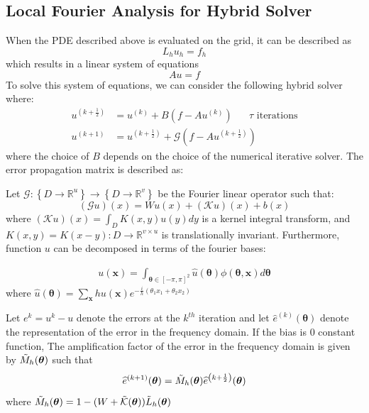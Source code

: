 \documentclass[12pt]{article}
\begin{document}
\subsection{Local Fourier Analysis for Hybrid Solver}

When the PDE described above is evaluated on the grid, it can be described as
$$L_hu_h = f_h$$
which results in a linear system of equations
$$Au = f$$
To solve this system of equations, we can consider the following hybrid solver where:
\begin{align*}
    u^{\left(k + \frac{1}{2}\right)} &= u^{\left(k \right)} + B(f - Au^{\left(k \right)}) \quad \text{ $\tau$ iterations}\\
    u^{\left(k + 1\right)} &= u^{\left(k + \frac{1}{2}\right)} + \mathcal{G}\left(f - Au^{\left(k + \frac{1}{2}\right)}\right)
\end{align*}
where the choice of $B$ depends on the choice of the numerical iterative solver. The error propagation matrix is described as:

Let $\mathcal{G}: \left\{D \to \mathbb{R}^u\right\} \to \left\{D \to \mathbb{R}^v\right\}$ be the Fourier linear operator such that:
$$\left(\mathcal{G}u\right)(x) = Wu(x) + (\mathcal{K}u)(x) + b(x)$$
where $(\mathcal{K}u)(x) =  \int_{D}K(x, y)u(y)dy$ is a kernel integral transform, and $K(x, y) = K(x - y): D \to \mathbb{R}^{v \times u}$ is translationally invariant. Furthermore, function $u$ can be decomposed in terms of the fourier bases:

\begin{align*}
    u(\mathbf{x}) = \int_{\boldsymbol{\theta} \in [-\pi, \pi]^2}  \widehat{u}(\boldsymbol{\theta})\phi(\boldsymbol{\theta},\mathbf{x})d\boldsymbol{\theta}
\end{align*}
 where $\widehat{u}(\boldsymbol{\theta}) = \sum_{\mathbf{x}} hu(\mathbf{x})e^{-\frac{i}{h}\left(\theta_1x_1 + \theta_2x_2\right)}$ 

\begin{lemma}
    Let $e^{k} = u^k - u$ denote the errors at the $k^{th}$ iteration and let $\widehat{e}^{(k)}(\boldsymbol{\theta})$ denote the representation of the error in the frequency domain. If the bias is $0$ constant function, The amplification factor of the error in the frequency domain is given by $\Tilde{M}_{h}(\boldsymbol{\theta})$ such that
    $$\widehat{e}^{(k + 1)}(\boldsymbol{\theta}) = \Tilde{M}_{h}(\boldsymbol{\theta})\widehat{e}^{\left(k + \frac{1}{2}\right)}(\boldsymbol{\theta})$$
    where $\Tilde{M}_{h}(\boldsymbol{\theta}) = 1 - (W + \Tilde{\mathcal{K}}(\boldsymbol{\theta}))\Tilde{L}_h(\boldsymbol{\theta})$
\end{lemma}
\end{document}
